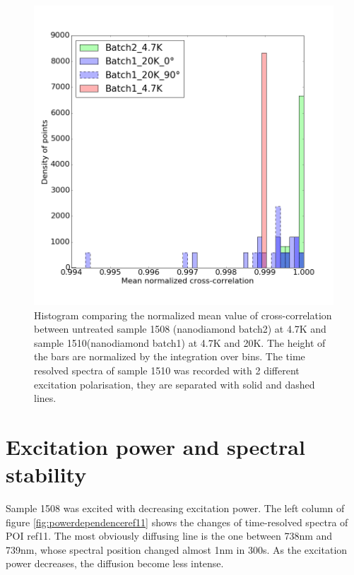 \begin{figure}[h]
	\centering
	\includegraphics[width=0.7\linewidth]{"Figures/pic/Histogram of normalized cross-correlation_1_2"}
	\caption{Histogram comparing the normalized mean value of cross-correlation between untreated sample 1508 (nanodiamond batch2) at 4.7K and sample 1510(nanodiamond batch1) at 4.7K and 20K. The height of the bars are normalized by the integration over bins. The time resolved spectra of sample 1510 was recorded with 2 different excitation polarisation, they are separated with solid and dashed lines.}
	\label{fig:histogram-of-normalized-cross-correlation12}
\end{figure}
 


\section{Excitation power and spectral stability}

Sample 1508 was excited with decreasing excitation power. The left column of figure \ref{fig:powerdependenceref11} shows the changes of time-resolved spectra of POI ref11. The most obviously diffusing line is the one between 738nm and 739nm, whose spectral position changed almost 1nm in 300s. As the excitation power decreases, the diffusion become less intense.

